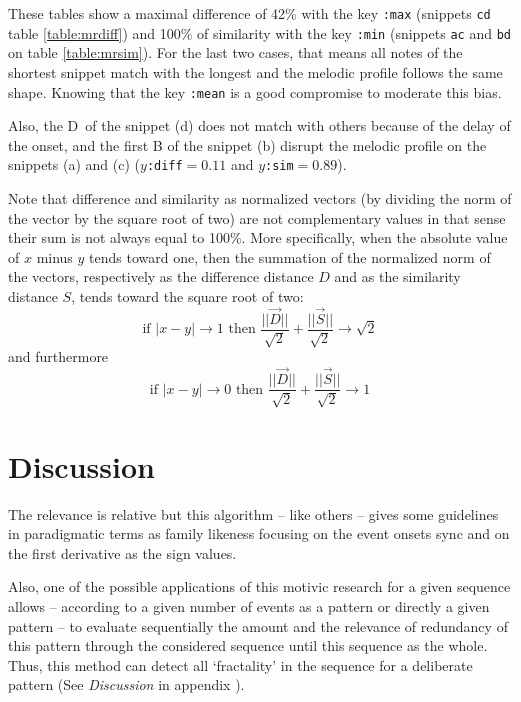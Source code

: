 These tables show a maximal difference of 42\% with the key \texttt{:max} (snippets \texttt{cd} table \ref{table:mrdiff}) and 100\% of similarity with the key \texttt{:min} (snippets \texttt{ac} and \texttt{bd} on table \ref{table:mrsim}).
For the last two cases, that means all notes of the shortest snippet match with the longest and the melodic profile follows the same shape. Knowing that the key \texttt{:mean} is a good compromise to moderate this bias. 

Also, the \textsf{D}\sh \  of the snippet (d) does not match with others because of the delay of the onset, and the first \textsf{B} of the snippet (b) disrupt the melodic profile on the snippets (a) and (c) ($y$\texttt{:diff}$=0.11$ and $y$\texttt{:sim}$=0.89$).

Note that difference and similarity as normalized vectors (by dividing the norm of the vector by the square root of two) are not complementary values in that sense their sum is not always equal to 100\%. More specifically, when the absolute value of $x$ minus $y$ tends toward one, then the summation of the normalized norm of the vectors, respectively as the difference distance $D$ and as the similarity distance $S$, tends toward the square root of two:
$$\text{if } |x-y| \to 1 \text{ then } \frac{||\overrightarrow{D}||}{\sqrt{2}} + \frac{||\overrightarrow{S}||}{\sqrt{2}} \to \sqrt{2}$$
 and furthermore
 $$\text{if } |x-y| \to 0 \text{ then } \frac{||\overrightarrow{D}||}{\sqrt{2}} + \frac{||\overrightarrow{S}||}{\sqrt{2}} \to 1$$
 
 \section{Discussion}

The relevance is relative but this algorithm -- like others -- gives some guidelines in paradigmatic terms as family likeness focusing on the event onsets sync  and on the first derivative  as the sign values. 

\bigskip

Also, one of the possible applications of this motivic research for a given sequence allows -- according to a given number of events as a pattern or directly a given pattern -- to evaluate sequentially the amount and the relevance of redundancy of this pattern through the considered sequence until this sequence as the whole. Thus, this method can detect all `fractality' in the sequence for a deliberate pattern (See \textsl{Discussion} in appendix ).
